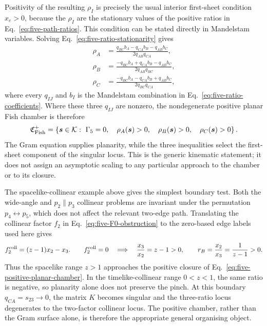 \documentclass[a4paper,11pt]{article}
\begin{document}
Positivity of the resulting \(\rho_I\) is precisely the usual interior
first-sheet condition \(x_e>0\), because the \(\rho_I\) are the stationary
values of the positive ratios in Eq.~\eqref{eq:five-path-ratios}.  This
condition can be stated directly in Mandelstam variables.  Solving
Eq.~\eqref{eq:five-ratio-stationarity} gives
\begin{align}
 \rho_A&=\frac{q_{BC}b_A-q_{CA}b_B-q_{AB}b_C}
                   {2q_{AB}q_{CA}},\nonumber\\
 \rho_B&=\frac{-q_{BC}b_A+q_{CA}b_B-q_{AB}b_C}
                   {2q_{AB}q_{BC}},\nonumber\\
 \rho_C&=\frac{-q_{BC}b_A-q_{CA}b_B+q_{AB}b_C}
                   {2q_{BC}q_{CA}},
 \label{eq:five-positive-ratios-mandelstam}
\end{align}
where every \(q_{IJ}\) and \(b_I\) is the Mandelstam combination in
Eq.~\eqref{eq:five-ratio-coefficients}.  Where these three \(q_{IJ}\) are
nonzero, the nondegenerate positive planar Fish chamber is therefore
\begin{equation}
 \mathfrak C_{\rm Fish}^{+}
 =\left\{\boldsymbol s\in\mathcal K:\
 \Gamma_5=0,\quad
 \rho_A(\boldsymbol s)>0,\quad
 \rho_B(\boldsymbol s)>0,\quad
 \rho_C(\boldsymbol s)>0\right\}.
 \label{eq:five-positive-planar-chamber}
\end{equation}
The Gram equation supplies planarity, while the three inequalities select
the first-sheet component of the singular locus.  This is the generic
kinematic statement; it does not assign an asymptotic scaling to any
particular approach to the chamber or to its closure.

The spacelike-collinear example above gives the simplest boundary test.  Both
the wide-angle and \(p_2\parallel p_3\) collinear problems are invariant under
the permutation \(p_4\leftrightarrow p_5\), which does not affect the
relevant two-edge path.
Translating the collinear factor \(f_2\) in
Eq.~\eqref{eq:five-F0-obstruction} to the zero-based edge labels used here
gives
\begin{equation}
 f_2^{\rm coll}=(z-1)x_2-x_3.
 \qquad
 f_2^{\rm coll}=0
 \quad\Longrightarrow\quad
 \frac{x_3}{x_2}=z-1>0,
 \qquad
 r_B=\frac{x_2}{x_3}=\frac{1}{z-1}>0.
 \label{eq:five-collinear-positive-chamber-test}
\end{equation}
Thus the spacelike range \(z>1\) approaches the positive closure of
Eq.~\eqref{eq:five-positive-planar-chamber}.  In the timelike-collinear
range \(0<z<1\), the same ratio is negative, so planarity alone does not
preserve the pinch.  At this boundary \(q_{CA}=s_{23}\to0\), the matrix
\(K\) becomes singular and the three-ratio locus degenerates to the
two-factor collinear locus.  The positive chamber, rather than the Gram
surface alone, is therefore the appropriate general organising object.
\end{document}

